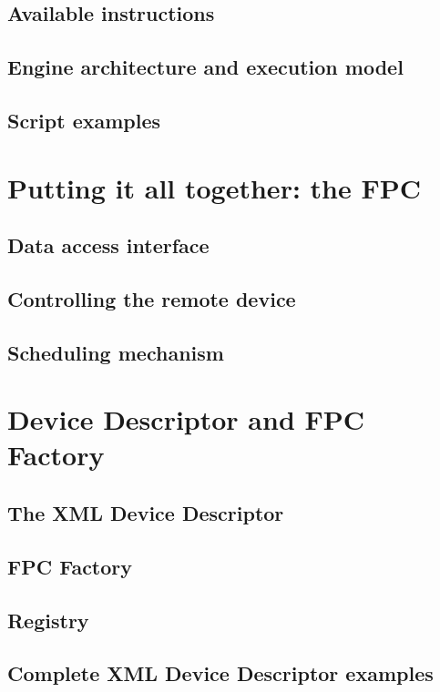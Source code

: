 \subsection{Available instructions}

\subsection{Engine architecture and execution model}

\subsection{Script examples}


\section{Putting it all together: the FPC}

\subsection{Data access interface}

\subsection{Controlling the remote device}

\subsection{Scheduling mechanism}


\section{Device Descriptor and FPC Factory}

\subsection{The XML Device Descriptor}

\subsection{FPC Factory}

\subsection{Registry}

\subsection{Complete XML Device Descriptor examples}
